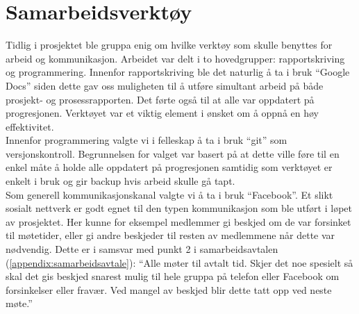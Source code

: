 \section{Samarbeidsverktøy}
Tidlig i prosjektet ble gruppa enig om hvilke verktøy som skulle benyttes for arbeid og kommunikasjon. Arbeidet var delt i to hovedgrupper: rapportskriving og programmering. Innenfor rapportskriving ble det naturlig å ta i bruk ``Google Docs'' siden dette gav oss muligheten til å utføre simultant arbeid på både prosjekt- og prosessrapporten. Det førte også til at alle var oppdatert på progresjonen. Verktøyet var et viktig element i ønsket om å oppnå en høy effektivitet.\\

Innenfor programmering valgte vi i felleskap å ta i bruk ``git'' som versjonskontroll. Begrunnelsen for valget var basert på at dette ville føre til en enkel måte å holde alle oppdatert på progresjonen samtidig som verktøyet er enkelt i bruk og gir backup hvis arbeid skulle gå tapt.\\

Som generell kommunikasjonskanal valgte vi å ta i bruk ``Facebook''. Et slikt sosialt nettverk er godt egnet til den typen kommunikasjon som ble utført i løpet av prosjektet. Her kunne for eksempel medlemmer gi beskjed om de var forsinket til møtetider, eller gi andre beskjeder til resten av medlemmene når dette var nødvendig. Dette er i samsvar med punkt 2 i samarbeidsavtalen (\ref{appendix:samarbeidsavtale}): ``Alle møter til avtalt tid. Skjer det noe spesielt så skal det gis beskjed snarest mulig til hele gruppa på telefon eller Facebook om forsinkelser eller fravær. Ved mangel av beskjed blir dette tatt opp ved neste møte.''\\
